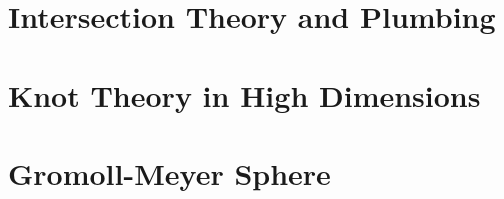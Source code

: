 \section{Intersection Theory and Plumbing}

\section{Knot Theory in High Dimensions}

\section{Gromoll-Meyer Sphere}
